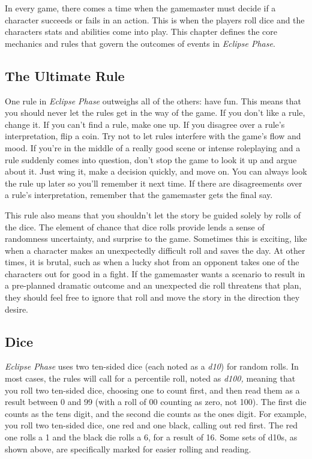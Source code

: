 In every game, there comes a time when the gamemaster
must decide if a character succeeds or fails in an
action. This is when the players roll dice and the characters
stats and abilities come into play. This chapter
defines the core mechanics and rules that govern the 
outcomes of events in \textit{Eclipse Phase}.

\subsection{The Ultimate Rule}

One rule in \textit{Eclipse Phase} outweighs all of the others: 
have fun. This means that you should never let the 
rules get in the way of the game. If you don't like a 
rule, change it. If you can't find a rule, make one up. 
If you disagree over a rule's interpretation, flip a coin. 
Try not to let rules interfere with the game's flow and 
mood. If you're in the middle of a really good scene 
or intense roleplaying and a rule suddenly comes into 
question, don't stop the game to look it up and argue 
about it. Just wing it, make a decision quickly, and 
move on. You can always look the rule up later so 
you'll remember it next time. If there are disagreements
over a rule's interpretation, remember that the
gamemaster gets the final say.

This rule also means that you shouldn't let the story 
be guided solely by rolls of the dice. The element of 
chance that dice rolls provide lends a sense of randomness
uncertainty, and surprise to the game. Sometimes
this is exciting, like when a character makes an unexpectedly
difficult roll and saves the day. At other
times, it is brutal, such as when a lucky shot from an 
opponent takes one of the characters out for good in a 
fight. If the gamemaster wants a scenario to result in a 
pre-planned dramatic outcome and an unexpected die 
roll threatens that plan, they should feel free to ignore 
that roll and move the story in the direction they desire.

\subsection{Dice}

\textit{Eclipse Phase} uses two ten-sided dice (each noted as 
a \textit{d10}) for random rolls. In most cases, the rules will 
call for a percentile roll, noted as \textit{d100,} meaning that 
you roll two ten-sided dice, choosing one to count first, 
and then read them as a result between 0 and 99 (with 
a roll of 00 counting as zero, not 100). The first die 
counts as the tens digit, and the second die counts as 
the ones digit. For example, you roll two ten-sided 
dice, one red and one black, calling out red first. The 
red one rolls a 1 and the black die rolls a 6, for a result 
of 16. Some sets of d10s, as shown above, are specifically
marked for easier rolling and reading.


